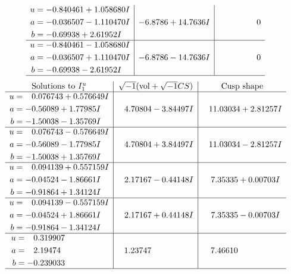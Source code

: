 \documentclass[1p]{elsarticle_modified}
\theoremstyle{definition}
\newcommand{\I}{\sqrt{-1}}
\begin{document}
$$\begin{array}{c|c|c}
\begin{aligned}
u &= -0.840461 + 1.058680 I \\
a &= -0.036507 - 1.110470 I \\
b &= -0.69938 + 2.61952 I\end{aligned}
 & -6.8786 + 14.7636 I & \phantom{-0.000000 } 0 \\ \hline\begin{aligned}
u &= -0.840461 - 1.058680 I \\
a &= -0.036507 + 1.110470 I \\
b &= -0.69938 - 2.61952 I\end{aligned}
 & -6.8786 - 14.7636 I & \phantom{-0.000000 } 0\\
 \hline 
 \end{array}$$\newpage$$\begin{array}{c|c|c}  
\text{Solutions to }I^u_{1}& \I (\text{vol} + \sqrt{-1}CS) & \text{Cusp shape}\\
 \hline 
\begin{aligned}
u &= \phantom{-}0.076743 + 0.576649 I \\
a &= -0.56089 + 1.77985 I \\
b &= -1.50038 - 1.35769 I\end{aligned}
 & \phantom{-}4.70804 - 3.84497 I & \phantom{-}11.03034 + 2.81257 I \\ \hline\begin{aligned}
u &= \phantom{-}0.076743 - 0.576649 I \\
a &= -0.56089 - 1.77985 I \\
b &= -1.50038 + 1.35769 I\end{aligned}
 & \phantom{-}4.70804 + 3.84497 I & \phantom{-}11.03034 - 2.81257 I \\ \hline\begin{aligned}
u &= \phantom{-}0.094139 + 0.557159 I \\
a &= -0.04524 - 1.86661 I \\
b &= -0.91864 + 1.34124 I\end{aligned}
 & \phantom{-}2.17167 - 0.44148 I & \phantom{-}7.35335 + 0.00703 I \\ \hline\begin{aligned}
u &= \phantom{-}0.094139 - 0.557159 I \\
a &= -0.04524 + 1.86661 I \\
b &= -0.91864 - 1.34124 I\end{aligned}
 & \phantom{-}2.17167 + 0.44148 I & \phantom{-}7.35335 - 0.00703 I \\ \hline\begin{aligned}
u &= \phantom{-}0.319907\phantom{ +0.000000I} \\
a &= \phantom{-}2.19474\phantom{ +0.000000I} \\
b &= -0.239033\phantom{ +0.000000I}\end{aligned}
 & \phantom{-}1.23747\phantom{ +0.000000I} & \phantom{-}7.46610\phantom{ +0.000000I}\\
 \hline 
 \end{array}$$\newpage\newpage\renewcommand{\arraystretch}{1}
\end{document}
